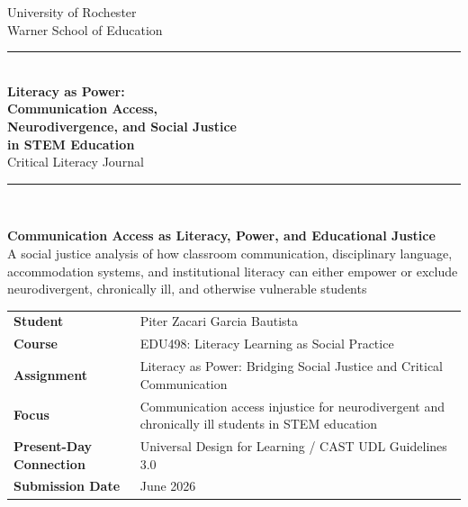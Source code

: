 \begin{titlepage}
\thispagestyle{empty}

\begin{center}
{\large University of Rochester\\}
{\normalsize Warner School of Education\\[0.35in]}

{\color{PrimaryRed}\rule{\textwidth}{1.4pt}}\\[0.22in]
{\Huge\bfseries Literacy as Power:\\[0.08in] Communication Access,\\[0.08in] Neurodivergence, and Social Justice\\[0.08in] in STEM Education}\\[0.18in]
{\Large Critical Literacy Journal}\\[0.22in]
{\color{PrimaryRed}\rule{0.78\textwidth}{0.7pt}}\\[0.32in]

\colorbox{SoftBlue}{%
\parbox{0.88\textwidth}{%
\centering\vspace{0.12in}
\textbf{Communication Access as Literacy, Power, and Educational Justice}\\[0.05in]
A social justice analysis of how classroom communication, disciplinary language, accommodation systems, and institutional literacy can either empower or exclude neurodivergent, chronically ill, and otherwise vulnerable students
\vspace{0.12in}
}%
}
\end{center}

\vspace{0.38in}

\begin{center}
\renewcommand{\arraystretch}{1.15}
\setlength{\tabcolsep}{4pt}
\begin{tabular}{>{\bfseries\RaggedLeft}p{1.65in} p{4.9in}}
Student & Piter Zacari Garcia Bautista \\
Course & EDU498: Literacy Learning as Social Practice \\
Assignment & Literacy as Power: Bridging Social Justice and Critical Communication \\
Focus & Communication access injustice for neurodivergent and chronically ill students in STEM education \\
Present-Day Connection & Universal Design for Learning / CAST UDL Guidelines 3.0 \\
Submission Date & June 2026 \\
\end{tabular}
\end{center}


\end{titlepage}
